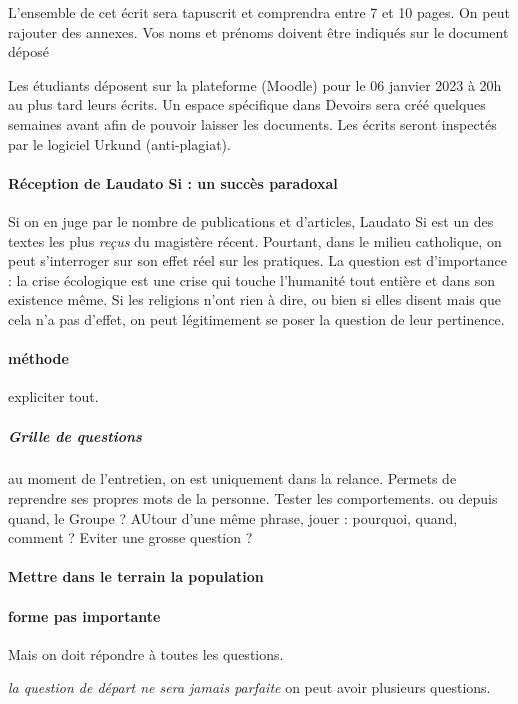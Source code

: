 L’ensemble de cet écrit sera tapuscrit et comprendra entre 7 et 10 pages. On peut rajouter des annexes. Vos noms et prénoms
doivent être indiqués sur le document déposé
 
Les étudiants déposent sur la plateforme (Moodle) pour le 06 janvier 2023 à 20h au plus tard
leurs écrits. Un espace spécifique dans Devoirs sera créé quelques semaines avant afin de
pouvoir laisser les documents. Les écrits seront inspectés par le logiciel Urkund (anti-plagiat).
 



 
     

\paragraph{Réception de Laudato Si : un succès paradoxal} Si on en juge par le nombre de publications et d'articles, Laudato Si est un des textes les plus \textit{reçus} du magistère récent. Pourtant, dans le milieu catholique, on peut s'interroger sur son effet réel sur les pratiques.
La question est d'importance : la crise écologique est une crise qui touche l'humanité tout entière et dans son existence même. Si les religions n'ont rien à dire, ou bien si elles disent mais que cela n'a pas d'effet, on peut légitimement se poser la question de leur pertinence.





\paragraph{méthode} expliciter tout.
\subparagraph{Grille de questions} au moment de l'entretien, on est uniquement dans la relance. Permets de reprendre ses propres mots de la personne. 
Tester les comportements. ou depuis quand, le Groupe ? AUtour d'une même phrase, jouer : pourquoi, quand, comment ? Eviter une grosse question ? 
\paragraph{Mettre dans le terrain la population}
\paragraph{forme pas importante} Mais on doit répondre à toutes les questions.


\textit{la question de départ ne sera jamais parfaite} on peut avoir plusieurs questions. 

